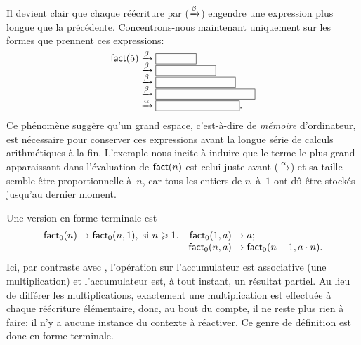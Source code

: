 Il devient clair que chaque réécriture par
(\(\xrightarrow{\smash[t]{\beta}}\)) engendre une expression plus
longue que la précédente. Concentrons-nous maintenant uniquement sur
les formes que prennent ces expressions:
\begin{equation*}
\setlength\fboxsep{0mm}
\begin{array}{r@{\;}c@{\;}l} 
\fun{fact}(5)
& \smashedrightarrow{\beta} & \fbox{\phantom{$5 \cdot \fun{fact}(4)$}}\\
& \smashedrightarrow{\beta} & \fbox{\phantom{$5 \cdot (4 \cdot \fun{fact}(3))$}}\\
& \smashedrightarrow{\beta} & \fbox{\phantom{$5 \cdot (4 \cdot (3 \cdot \fun{fact}(2)))$}}\\
& \smashedrightarrow{\beta} & \fbox{\phantom{$5 \cdot (4 \cdot (3 \cdot (2 \cdot \fun{fact}(1))))$}}\\
& \smashedrightarrow{\alpha} & \fbox{\phantom{$5 \cdot (4 \cdot (3
    \cdot (2 \cdot (1))))$}}.
\end{array}
\end{equation*}
Ce phénomène suggère qu'un grand espace, c'est-à-dire de
\emph{mémoire} d'ordinateur, est nécessaire pour conserver ces
expressions avant la longue série de calculs arithmétiques à la
fin. L'exemple nous incite à induire que le terme le plus grand
apparaissant dans l'évaluation de \(\textsf{fact}(n)\) est celui juste
avant (\(\xrightarrow{\smash[t]{\alpha}}\)) et sa taille semble être
proportionnelle à~\(n\), car tous les entiers de \(n\)~à~\(1\) ont dû
être stockés jusqu'au dernier moment.

Une version en forme terminale
 est
\begin{equation*}
\begin{array}{@{}r@{\;}l@{\;}lr@{\;}l@{\;}l@{}}
\fun{fact}_0(n) & \rightarrow & \fun{fact}_0(n,1),
\;\text{si \(n \geqslant 1\)}. & \fun{fact}_0(1,a) & \rightarrow & a;\\
&&& \fun{fact}_0(n,a) & \rightarrow & \fun{fact}_0(n-1,a \cdot n).
\end{array}
\end{equation*}
Ici, par contraste avec , l'opération sur l'accumulateur
est associative (une multiplication) et l'accumulateur est, à tout
instant, un résultat partiel. Au lieu de différer les multiplications,
exactement une multiplication est effectuée à chaque réécriture
élémentaire, donc, au bout du compte, il ne reste plus rien à faire:
il n'y a aucune instance du contexte à réactiver. Ce genre de
définition est donc en forme terminale.

